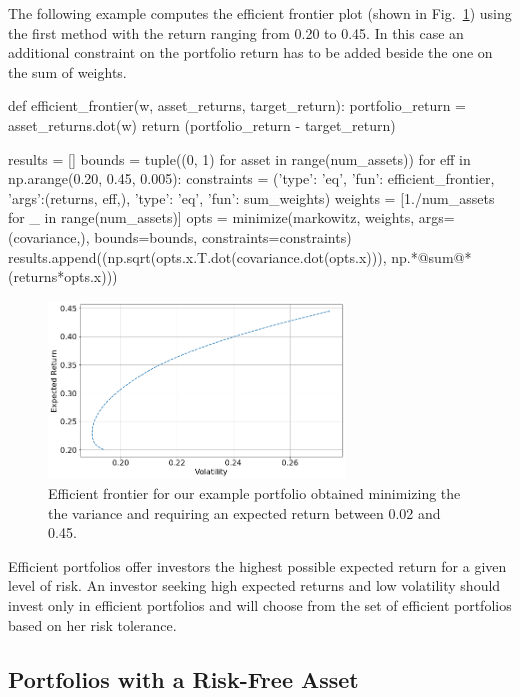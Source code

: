 The following example computes the efficient frontier plot (shown in Fig.~\ref{fig:efficient_frontier}) using the first method with the return ranging from 0.20 to 0.45.
In this case an additional constraint on the portfolio return has to be added beside the one on the sum of weights.

\begin{ipython}
def efficient_frontier(w, asset_returns, target_return):
    portfolio_return = asset_returns.dot(w)
    return (portfolio_return - target_return)

results = []
bounds = tuple((0, 1) for asset in range(num_assets))
for eff in np.arange(0.20, 0.45, 0.005):
    constraints = ({'type': 'eq', 'fun': efficient_frontier,
                    'args':(returns, eff,)},
                   {'type': 'eq', 'fun': sum_weights})
weights = [1./num_assets for _ in range(num_assets)]
opts = minimize(markowitz, weights, args=(covariance,),
                bounds=bounds, constraints=constraints)
results.append((np.sqrt(opts.x.T.dot(covariance.dot(opts.x))),
                np.*@sum@*(returns*opts.x)))
\end{ipython}

\begin{figure}[htb]
\centering
\includegraphics[width=0.7\textwidth]{figures/efficient_frontier}
\caption{Efficient frontier for our example portfolio obtained minimizing the the variance and requiring an expected return between 0.02 and 0.45.}
\label{fig:efficient_frontier}
\end{figure}

Efficient portfolios offer investors the highest possible expected return for a given level of risk. 
An investor seeking high expected returns and low volatility should invest only in efficient portfolios and will choose from the set of efficient portfolios based on her risk tolerance.
    
\subsection{Portfolios with a Risk-Free Asset}
\label{portfolios-with-a-risk-free-asset}

